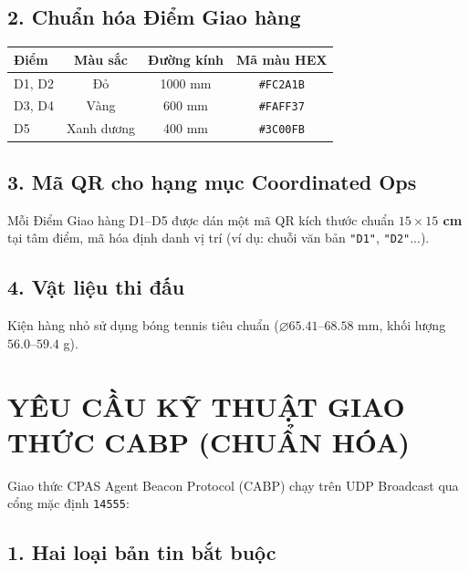 \documentclass[12pt,a4paper]{article}
\begin{document}
\subsection*{2. Chuẩn hóa Điểm Giao hàng}
\begin{center}
\begin{tabular}{lccc}
\toprule
\textbf{Điểm} & \textbf{Màu sắc} & \textbf{Đường kính} & \textbf{Mã màu HEX} \\
\midrule
D1, D2 & Đỏ & 1000 mm & \texttt{\#FC2A1B} \\
D3, D4 & Vàng & 600 mm & \texttt{\#FAFF37} \\
D5 & Xanh dương & 400 mm & \texttt{\#3C00FB} \\
\bottomrule
\end{tabular}
\end{center}

\subsection*{3. Mã QR cho hạng mục Coordinated Ops}
Mỗi Điểm Giao hàng D1–D5 được dán một mã QR kích thước chuẩn \textbf{$15 \times 15$ cm} tại tâm điểm, mã hóa định danh vị trí (ví dụ: chuỗi văn bản \texttt{"D1"}, \texttt{"D2"}...).

\subsection*{4. Vật liệu thi đấu}
Kiện hàng nhỏ sử dụng bóng tennis tiêu chuẩn ($\varnothing 65.41$–$68.58$ mm, khối lượng $56.0$–$59.4$ g).

\section{YÊU CẦU KỸ THUẬT GIAO THỨC CABP (CHUẨN HÓA)}

Giao thức CPAS Agent Beacon Protocol (CABP) chạy trên UDP Broadcast qua cổng mặc định \texttt{14555}:

\subsection*{1. Hai loại bản tin bắt buộc}
\end{document}
